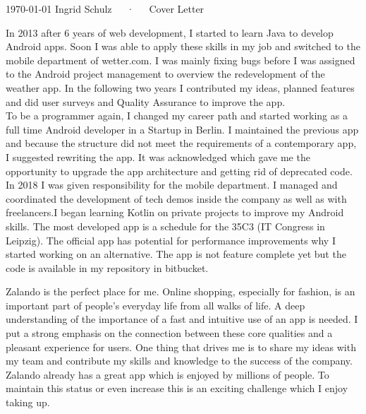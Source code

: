\documentclass[11pt, a4paper]{awesome-cv}
\begin{document}
\makecvheader[R]

\makecvfooter
  {\today}
  {Ingrid Schulz~~~·~~~Cover Letter}
  {}

\makelettertitle

\begin{cvletter}

In 2013 after 6 years of web development, I started to learn Java to develop Android apps. Soon I was able to apply these skills in my job and switched to the mobile department of wetter.com. I was mainly fixing bugs before I was assigned to the Android project management to overview the redevelopment of the weather app. In the following two years I contributed my ideas, planned features and did user surveys and Quality Assurance to improve the app.\\
To be a programmer again, I changed my career path and started working as a full time Android developer in a Startup in Berlin. I maintained the previous app and because the structure did not meet the requirements of a contemporary app, I suggested rewriting the app. It was acknowledged which gave me the opportunity to upgrade the app architecture and getting rid of deprecated code.\\
In 2018 I was given responsibility for the mobile department. I managed and coordinated the development of tech demos inside the company as well as with freelancers.I began learning Kotlin on private projects to improve my Android skills. The most developed app is a schedule for the 35C3 (IT Congress in Leipzig). The official app has potential for performance improvements why I started working on an alternative. The app is not feature complete yet but the code is available in my repository in bitbucket.

Zalando is the perfect place for me. Online shopping, especially for fashion, is an important part of people’s everyday life from all walks of life. A deep understanding of the importance of a fast and intuitive use of an app is needed. I put a strong emphasis on the connection between these core qualities and a pleasant experience for users. One thing that drives me is to share my ideas with my team and contribute my skills and knowledge to the success of the company. Zalando already has a great app which is enjoyed by millions of people. To maintain this status or even increase this is an exciting challenge which I enjoy taking up.


\end{cvletter}
\end{document}
